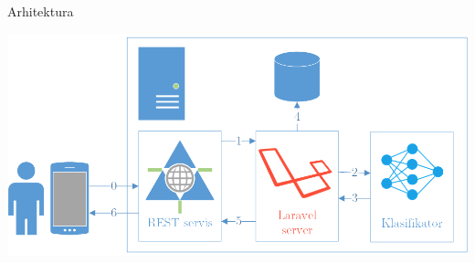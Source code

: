 \documentclass{beamer}
\begin{document}
\begin{frame}{Arhitektura}
    \begin{center}
        \includegraphics[width=\textwidth]{./slike/arch.png}
    \end{center}
\end{frame}
\end{document}
